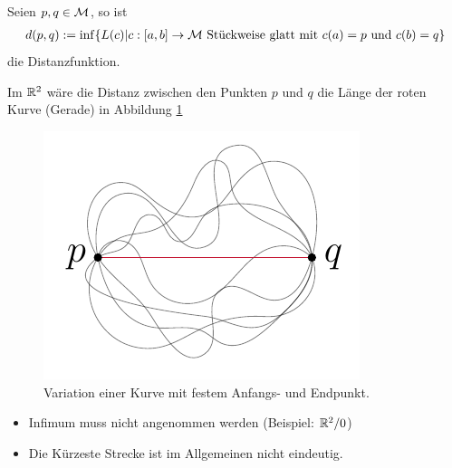 \begin{defs}[Distanzfunktion]
    Seien $p, q \in \mathcal{M}$, so ist
    \begin{align}
        \label{eq:distanzfuntion}
        d(p,q) := \inf \{ L(c) \vert c : [a, b]\to \mfk \ \text{Stückweise glatt mit} \ c(a) = p \ \text{und} \ c(b) = q \}
    \end{align}
    die Distanzfunktion.
\end{defs}
\begin{bsp}
Im $\mathbb{R}^2$ wäre die Distanz zwischen den Punkten $p$ und $q$ die Länge der roten Kurve (Gerade) in Abbildung \ref{img:variation}
\begin{figure}[H]
\centering
\includegraphics[width=0.3\linewidth]{figures/tikz/variation.pdf}
\caption{Variation einer Kurve mit festem Anfangs- und Endpunkt.}
\label{img:variation}
\end{figure} 
\end{bsp}


\begin{bem}\leavevmode
    \begin{itemize}
        \item Infimum muss nicht angenommen werden (Beispiel: $\mathbb{R}^2 / 0 $)
        \item Die Kürzeste Strecke ist im Allgemeinen nicht eindeutig.
     \end{itemize}
\end{bem}
